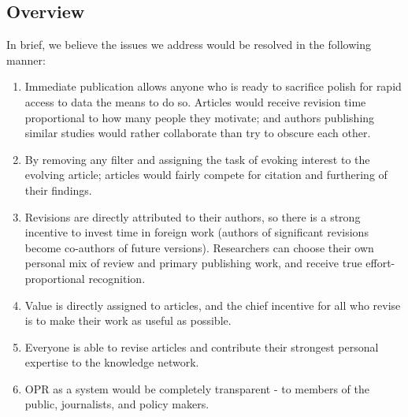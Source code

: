 \subsection{Overview}
In brief, we believe the issues we address would be resolved in the following manner:
\begin{enumerate}
	\item Immediate publication allows anyone who is ready to sacrifice polish for rapid access to data the means to do so.
	Articles would receive revision time proportional to how many people they motivate; and authors publishing similar studies would rather collaborate than try to obscure each other.
	\item By removing any filter and assigning the task of evoking interest to the evolving article;
	articles would fairly compete for citation and furthering of their findings.
	\item Revisions are directly attributed to their authors, so there is a strong incentive to invest time in foreign work
	(authors of significant revisions become co-authors of future versions). 
	Researchers can choose their own personal mix of review and primary publishing work, and receive true effort-proportional recognition. 
	\item Value is directly assigned to articles, and the chief incentive for all who revise is to make their work as useful as possible.
	\item Everyone is able to revise articles and contribute their strongest personal expertise to the knowledge network.
	\item OPR as a system would be completely transparent - to members of the public, journalists, and policy makers. 
\end{enumerate}
